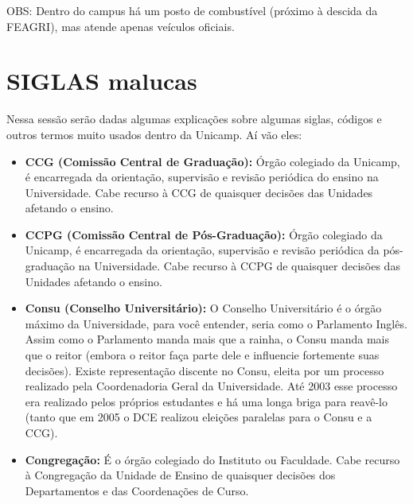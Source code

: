 OBS: Dentro do campus há um posto de combustível (próximo à descida da FEAGRI),
mas atende apenas veículos oficiais.

\section{SIGLAS malucas}

Nessa sessão serão dadas algumas explicações sobre algumas siglas, códigos
e outros termos muito usados dentro da Unicamp. Aí vão eles:

\begin{itemize}
\item  \textbf{CCG (Comissão Central de Graduação):} Órgão colegiado da Unicamp, é encarregada da orientação, supervisão e revisão periódica do ensino na Universidade. Cabe recurso à CCG de quaisquer decisões das Unidades afetando o ensino.
\end{itemize}

\begin{itemize}
\item  \textbf{CCPG (Comissão Central de Pós-Graduação):} Órgão colegiado da Unicamp, é encarregada da orientação, supervisão e revisão periódica da pós-graduação na Universidade. Cabe recurso à CCPG de quaisquer decisões das Unidades afetando o ensino.
\end{itemize}

\begin{itemize}
\item  \textbf{Consu (Conselho Universitário):} O Conselho Universitário é o órgão máximo da Universidade, para você entender, seria como o Parlamento Inglês. Assim como o Parlamento manda mais que a rainha, o Consu manda mais que o reitor (embora o reitor faça parte dele e influencie fortemente suas decisões). Existe representação discente no Consu, eleita por um processo realizado pela Coordenadoria Geral da Universidade. Até 2003 esse processo era realizado pelos próprios estudantes e há uma longa briga para reavê-lo (tanto que em 2005 o DCE realizou eleições paralelas para o Consu e a CCG).
\end{itemize}

\begin{itemize}
\item  \textbf{Congregação:} É o órgão colegiado do Instituto ou Faculdade. Cabe recurso à Congregação da Unidade de Ensino de quaisquer decisões dos Departamentos e das Coordenações de Curso.
\end{itemize}

